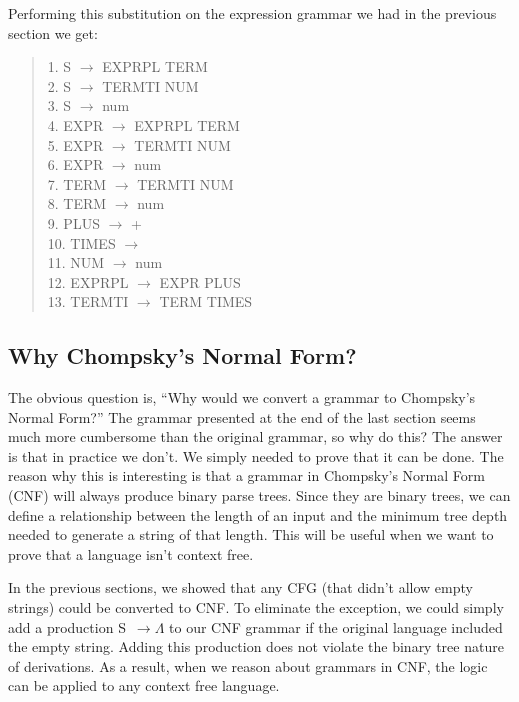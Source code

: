 \documentclass[letterpaper,12pt,openany,reqno]{book}%
\begin{document}
Performing this substitution on the expression grammar we had in the previous section we get:
\begin{quote}
{1. \ttfamily S} $\rightarrow$ {\ttfamily EXPRPL TERM}\\
{2. \ttfamily S} $\rightarrow$ {\ttfamily TERMTI NUM}\\
{3. \ttfamily S} $\rightarrow$ {\ttfamily num}\\
{4. \ttfamily EXPR} $\rightarrow$ {\ttfamily EXPRPL TERM}\\
{5. \ttfamily EXPR} $\rightarrow$ {\ttfamily TERMTI NUM}\\
{6. \ttfamily EXPR} $\rightarrow$ {\ttfamily num}\\
{7. \ttfamily TERM} $\rightarrow$ {\ttfamily TERMTI NUM}\\
{8. \ttfamily TERM} $\rightarrow$ {\ttfamily num}\\
{9. \ttfamily PLUS} $\rightarrow$ {\ttfamily +}\\
{10. \ttfamily TIMES} $\rightarrow$ {\ttfamily *}\\
{11. \ttfamily NUM} $\rightarrow$ {\ttfamily num}\\
{12. \ttfamily EXPRPL} $\rightarrow$ {\ttfamily EXPR PLUS}\\
{13. \ttfamily TERMTI} $\rightarrow$ {\ttfamily TERM TIMES}\\
\end{quote}

\subsection{Why Chompsky's Normal Form?}
The obvious question is, ``Why would we convert a grammar to Chompsky's Normal Form?'' The grammar presented at the end of the last section seems much more cumbersome than the original grammar, so why do this? The answer is that in practice we don't. We simply needed to prove that it can be done. The reason why this is interesting is that a grammar in Chompsky's Normal Form (CNF) will always produce binary parse trees. Since they are binary trees, we can define a relationship between the length of an input and the minimum tree depth needed to generate a string of that length. This will be useful when we want to prove that a language isn't context free.

In the previous sections, we showed that any CFG (that didn't allow empty strings) could be converted to CNF. To eliminate the exception, we could simply add a production {\ttfamily S}~$\rightarrow \Lambda$ to our CNF grammar if the original language included the empty string. Adding this production does not violate the binary tree nature of derivations. As a result, when we reason about grammars in CNF, the logic can be applied to any context free language.
\end{document}
